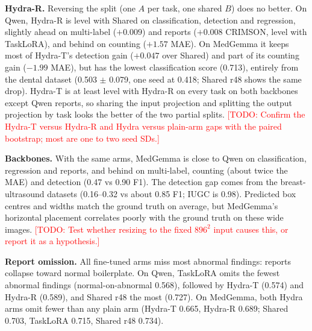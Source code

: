 \documentclass[journal,twoside,web]{ieeecolor}
\newcommand{\todo}[1]{\textcolor{red}{[TODO: #1]}}
\begin{document}
\textbf{Hydra-R.} Reversing the split (one $A$ per task, one shared $B$)
does no better. On Qwen, Hydra-R is level with Shared on classification,
detection and regression, slightly ahead on multi-label ($+0.009$) and
reports ($+0.008$ CRIMSON, level with TaskLoRA), and behind on counting
($+1.57$ MAE). On MedGemma it keeps most of Hydra-T's detection gain
($+0.047$ over Shared) and part of its counting gain ($-1.99$ MAE), but has
the lowest classification score (0.713), entirely from the dental dataset
(0.503 $\pm$ 0.079, one seed at 0.418; Shared r48 shows the same drop).
Hydra-T is at least level with Hydra-R on every task on both backbones except
Qwen reports, so sharing the input projection and splitting the output
projection by task looks the better of the two partial splits.
\todo{Confirm the Hydra-T versus Hydra-R and Hydra versus plain-arm gaps with
the paired bootstrap; most are one to two seed SDs.}

\textbf{Backbones.} With the same arms, MedGemma is close to Qwen on
classification, regression and reports, and behind on multi-label, counting
(about twice the MAE) and detection (0.47 vs 0.90 F1). The detection gap
comes from the breast-ultrasound datasets (0.16--0.32 vs about 0.85 F1;
IUGC is 0.98). Predicted box centres and widths match the ground truth on
average, but MedGemma's horizontal placement correlates poorly with the
ground truth on these wide images. \todo{Test whether resizing to the fixed
$896^2$ input causes this, or report it as a hypothesis.}

\textbf{Report omission.} All fine-tuned arms miss most abnormal findings:
reports collapse toward normal boilerplate. On Qwen, TaskLoRA omits the
fewest abnormal findings (normal-on-abnormal 0.568), followed by Hydra-T
(0.574) and Hydra-R (0.589), and Shared r48 the most (0.727). On MedGemma,
both Hydra arms omit fewer than any plain arm (Hydra-T 0.665, Hydra-R 0.689;
Shared 0.703, TaskLoRA 0.715, Shared r48 0.734).
\end{document}
